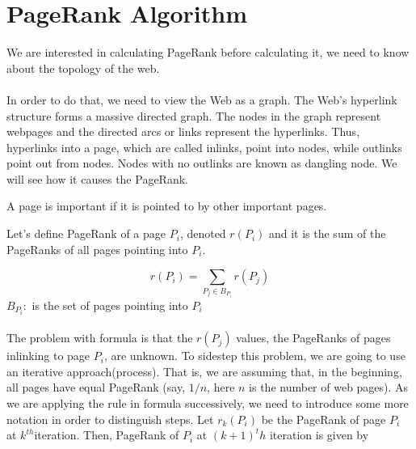 \section{PageRank Algorithm}
We are interested in calculating PageRank before calculating it, we need to know about the topology of the web.\\
\\
In order to do that, we need to view the Web as a graph. The Web's hyperlink structure forms a massive directed graph. The nodes in the graph represent webpages and the directed arcs or links represent the hyperlinks. Thus, hyperlinks into a page, which are called inlinks, point into nodes, while outlinks point out from nodes. Nodes with no outlinks are known as dangling node. We will see how it causes the PageRank.\\
	
\begin{center}
\end{center}

A page is important if it is pointed to by other important pages.

\noindent Let's define PageRank of a page $P_{i}$, denoted $r\left(P_{i}\right)$ and it is the sum of the PageRanks of all pages pointing into $P_{i}$.
	
$$
r\left(P_{i}\right)=\sum_{P_{j} \in B_{P_{i}}} r\left(P_{j}\right)
$$
$B_{P_{i}}:$ is the set of pages pointing into $P_{i}$ \\
\\
The problem with formula is that the $r(P_{j})$ values, the PageRanks of pages inlinking to page $P_{i}$, are unknown. To sidestep this problem, we are going to use an iterative approach(process). That is, we are assuming that, in the beginning, all pages have equal PageRank (say, $1/n$, here $n$ is the number of web pages). As we are applying the rule in formula successively, we need to introduce some more notation in order to distinguish steps. Let $r_{k}\left(P_{i}\right)$ be the PageRank of page $P_{i}$ at $k^{th}$iteration. Then, PageRank of $P_i$ at $(k+1)^th$ iteration is given by
	
